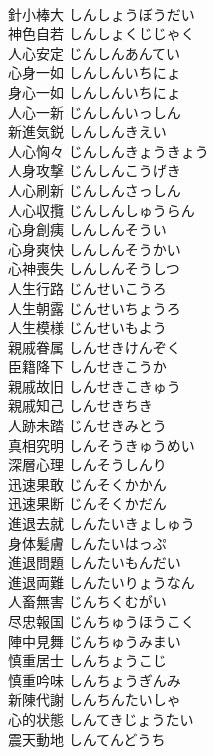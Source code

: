 \documentclass[8pt]{extreport}
\begin{document}
\begin{CJK}{UTF8}{min}
\\	針小棒大	しんしょうぼうだい	
\\	神色自若	しんしょくじじゃく	
\\	人心安定	じんしんあんてい	
\\	心身一如	しんしんいちにょ	
\\	身心一如	しんしんいちにょ	
\\	人心一新	じんしんいっしん	
\\	新進気鋭	しんしんきえい	
\\	人心恟々	じんしんきょうきょう	
\\	人身攻撃	じんしんこうげき	
\\	人心刷新	じんしんさっしん	
\\	人心収攬	じんしんしゅうらん	
\\	心身創痍	しんしんそうい	
\\	心身爽快	しんしんそうかい	
\\	心神喪失	しんしんそうしつ	
\\	人生行路	じんせいこうろ	
\\	人生朝露	じんせいちょうろ	
\\	人生模様	じんせいもよう	
\\	親戚眷属	しんせきけんぞく	
\\	臣籍降下	しんせきこうか	
\\	親戚故旧	しんせきこきゅう	
\\	親戚知己	しんせきちき	
\\	人跡未踏	じんせきみとう	
\\	真相究明	しんそうきゅうめい	
\\	深層心理	しんそうしんり	
\\	迅速果敢	じんそくかかん	
\\	迅速果断	じんそくかだん	
\\	進退去就	しんたいきょしゅう	
\\	身体髪膚	しんたいはっぷ	
\\	進退問題	しんたいもんだい	
\\	進退両難	しんたいりょうなん	
\\	人畜無害	じんちくむがい	
\\	尽忠報国	じんちゅうほうこく	
\\	陣中見舞	じんちゅうみまい	
\\	慎重居士	しんちょうこじ	
\\	慎重吟味	しんちょうぎんみ	
\\	新陳代謝	しんちんたいしゃ	
\\	心的状態	しんてきじょうたい	
\\	震天動地	しんてんどうち	

\end{CJK}
\end{document}
